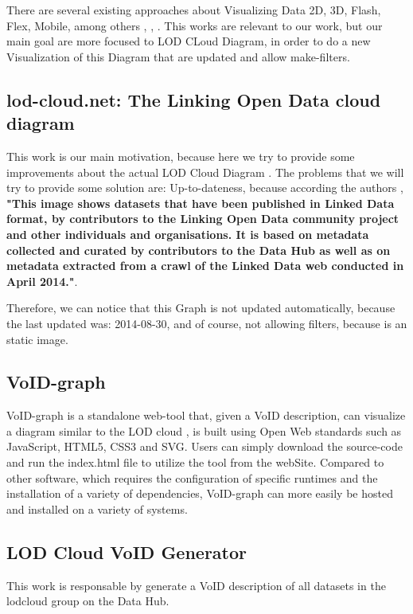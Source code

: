 
% 

There are several existing approaches about Visualizing Data 2D, 3D, Flash, Flex, Mobile, among others \cite{SeveralSurveys}, \cite{Dadzie2011}, \cite{IJST38378}. This works are relevant to our work, but our main goal are more focused to LOD CLoud Diagram, in order to do a new Visualization of this Diagram that are updated and allow make-filters.

\subsection{lod-cloud.net: The Linking Open Data cloud diagram}
This work is our main motivation, because here we try to provide some improvements about the actual LOD Cloud Diagram \cite{lodcloud}.
The problems that we will try to provide some solution are: Up-to-dateness, because according the authors \cite{lodcloud}, \textbf{"This image shows datasets that have been published in Linked Data format, by contributors to the Linking Open Data community project and other individuals and organisations. It is based on metadata collected and curated by contributors to the Data Hub as well as on metadata extracted from a crawl of the Linked Data web conducted in April 2014."}.

Therefore, we can notice that this Graph is not updated automatically, because the last updated was: 2014-08-30, and of course, not allowing filters, because is an static image.


\subsection{VoID-graph}
VoID-graph \cite{Voidgraph} is a standalone web-tool that, given a VoID description, can visualize a diagram similar to the LOD cloud \cite{lodcloud}, is built using Open Web standards such as JavaScript, HTML5, CSS3 and SVG. Users can simply download the source-code and run the index.html file to utilize the tool from the webSite. Compared to other software, which requires the configuration of specific runtimes and the installation of a variety of dependencies, VoID-graph can more easily be hosted and installed on a variety of systems.

\subsection{LOD Cloud VoID Generator}
This work \cite{VoIdGenerator} is responsable by generate a VoID description of all datasets in the lodcloud group on the Data Hub.

